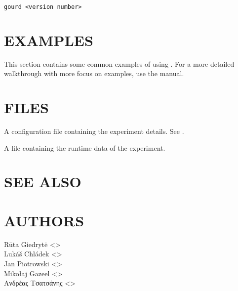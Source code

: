 \documentclass[a4paper,english]{article}
\begin{document}
\begin{adjustwidth}{18pt}{0pt}
                \texttt{gourd <version number>}



    \section{EXAMPLES}

        This section contains some common examples of using .
        For a more detailed walkthrough with more focus on examples, use the  manual.




    \section{FILES}

        \begin{Description}[Files]\setlength{\itemsep}{0cm}
            \item[\File{gourd.toml}] A configuration file containing the experiment details. See .
            \item[\File{<experiment-dir>/<experiment-number>.lock}] A file containing the runtime data of the experiment.
        \end{Description}

    \section{SEE ALSO}



    \section{AUTHORS}
    Rūta Giedrytė <>\\[0.1cm]\MANbr
    Lukáš Chládek <>\\[0.1cm]\MANbr
    Jan Piotrowski <>\\[0.1cm]\MANbr
    Mikołaj Gazeel <>\\[0.1cm]\MANbr
    Ανδρέας Τσατσάνης <>\\[0.1cm]\MANbr
\end{adjustwidth}
\end{document}
